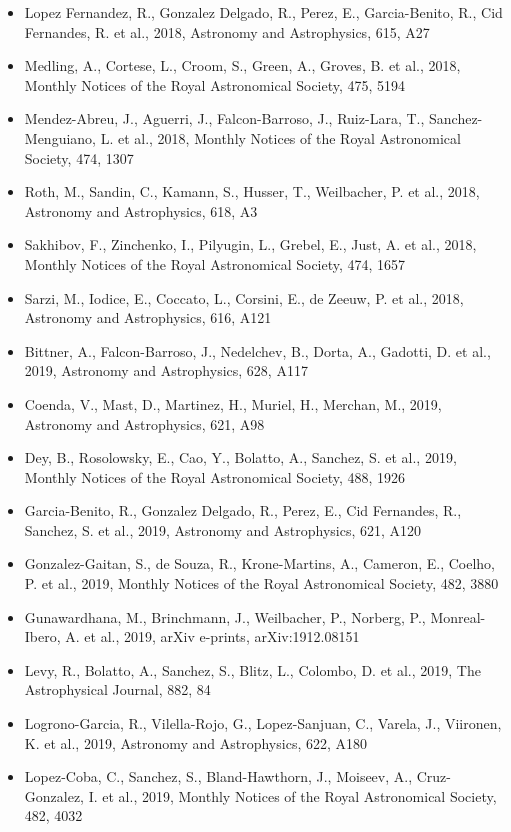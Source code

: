 \documentclass{letter}
\begin{document}
\begin{enumerate}
\begin{itemize}
\item Lopez Fernandez, R., Gonzalez Delgado, R., Perez, E., Garcia-Benito, R., Cid Fernandes, R. et al., 2018, Astronomy and Astrophysics, 615, A27
\item Medling, A., Cortese, L., Croom, S., Green, A., Groves, B. et al., 2018, Monthly Notices of the Royal Astronomical Society, 475, 5194
\item Mendez-Abreu, J., Aguerri, J., Falcon-Barroso, J., Ruiz-Lara, T., Sanchez-Menguiano, L. et al., 2018, Monthly Notices of the Royal Astronomical Society, 474, 1307
\item Roth, M., Sandin, C., Kamann, S., Husser, T., Weilbacher, P. et al., 2018, Astronomy and Astrophysics, 618, A3
\item Sakhibov, F., Zinchenko, I., Pilyugin, L., Grebel, E., Just, A. et al., 2018, Monthly Notices of the Royal Astronomical Society, 474, 1657
\item Sarzi, M., Iodice, E., Coccato, L., Corsini, E., de Zeeuw, P. et al., 2018, Astronomy and Astrophysics, 616, A121
\item Bittner, A., Falcon-Barroso, J., Nedelchev, B., Dorta, A., Gadotti, D. et al., 2019, Astronomy and Astrophysics, 628, A117
\item Coenda, V., Mast, D., Martinez, H., Muriel, H., Merchan, M., 2019, Astronomy and Astrophysics, 621, A98
\item Dey, B., Rosolowsky, E., Cao, Y., Bolatto, A., Sanchez, S. et al., 2019, Monthly Notices of the Royal Astronomical Society, 488, 1926
\item Garcia-Benito, R., Gonzalez Delgado, R., Perez, E., Cid Fernandes, R., Sanchez, S. et al., 2019, Astronomy and Astrophysics, 621, A120
\item Gonzalez-Gaitan, S., de Souza, R., Krone-Martins, A., Cameron, E., Coelho, P. et al., 2019, Monthly Notices of the Royal Astronomical Society, 482, 3880
\item Gunawardhana, M., Brinchmann, J., Weilbacher, P., Norberg, P., Monreal-Ibero, A. et al., 2019, arXiv e-prints, arXiv:1912.08151
\item Levy, R., Bolatto, A., Sanchez, S., Blitz, L., Colombo, D. et al., 2019, The Astrophysical Journal, 882, 84
\item Logrono-Garcia, R., Vilella-Rojo, G., Lopez-Sanjuan, C., Varela, J., Viironen, K. et al., 2019, Astronomy and Astrophysics, 622, A180
\item Lopez-Coba, C., Sanchez, S., Bland-Hawthorn, J., Moiseev, A., Cruz-Gonzalez, I. et al., 2019, Monthly Notices of the Royal Astronomical Society, 482, 4032

\end{itemize}
\end{enumerate}
\end{document}
